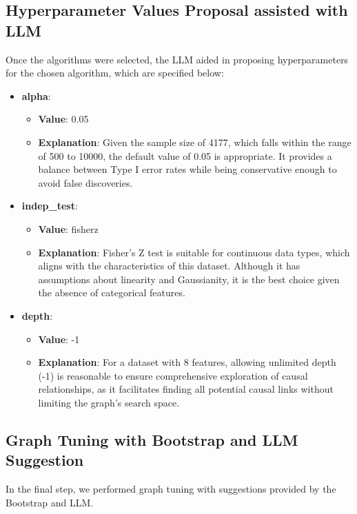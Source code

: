 \documentclass{article}
\begin{document}
\subsection{Hyperparameter Values Proposal assisted with LLM}
Once the algorithms were selected, the LLM aided in proposing hyperparameters 
for the chosen algorithm, which are specified below:
        
\begin{itemize}
    \item \textbf{alpha}:
    \begin{itemize}
        \item \textbf{Value}: 0.05
        \item \textbf{Explanation}: Given the sample size of 4177, which falls within the range of 500 to 10000, the default value of 0.05 is appropriate. It provides a balance between Type I error rates while being conservative enough to avoid false discoveries.
    \end{itemize}
    
    \item \textbf{indep\_test}:
    \begin{itemize}
        \item \textbf{Value}: fisherz
        \item \textbf{Explanation}: Fisher's Z test is suitable for continuous data types, which aligns with the characteristics of this dataset. Although it has assumptions about linearity and Gaussianity, it is the best choice given the absence of categorical features.
    \end{itemize}
    
    \item \textbf{depth}:
    \begin{itemize}
        \item \textbf{Value}: -1
        \item \textbf{Explanation}: For a dataset with 8 features, allowing unlimited depth (-1) is reasonable to ensure comprehensive exploration of causal relationships, as it facilitates finding all potential causal links without limiting the graph's search space.
    \end{itemize}
    
\end{itemize}

\subsection{Graph Tuning with Bootstrap and LLM Suggestion}
In the final step, we performed graph tuning with suggestions provided by the Bootstrap and LLM.
            
\end{document}
